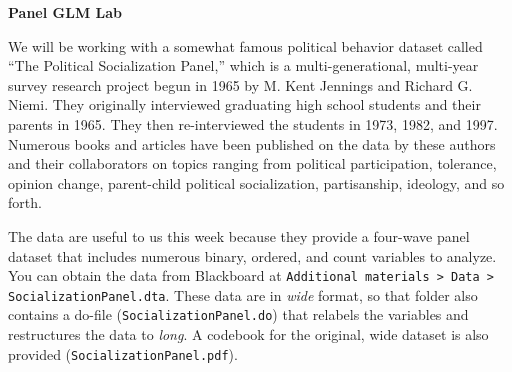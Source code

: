 \documentclass[a4paper,12pt]{article}
\begin{document}
\begin{center}
\textbf{Panel GLM Lab}
\end{center}

\noindent We will be working with a somewhat famous political behavior dataset called ``The Political Socialization Panel,'' which is a multi-generational, multi-year survey research project begun in 1965 by M. Kent Jennings and Richard G. Niemi. They originally interviewed graduating high school students and their parents in 1965. They then re-interviewed the students in 1973, 1982, and 1997. Numerous books and articles have been published on the data by these authors and their collaborators on topics ranging from political participation, tolerance, opinion change, parent-child political socialization, partisanship, ideology, and so forth.

The data are useful to us this week because they provide a four-wave panel dataset that includes numerous binary, ordered, and count variables to analyze. You can obtain the data from Blackboard at \texttt{Additional materials > Data > SocializationPanel.dta}. These data are in \textit{wide} format, so that folder also contains a do-file (\texttt{SocializationPanel.do}) that relabels the variables and restructures the data to \textit{long}. A codebook for the original, wide dataset is also provided (\texttt{SocializationPanel.pdf}).
\end{document}
